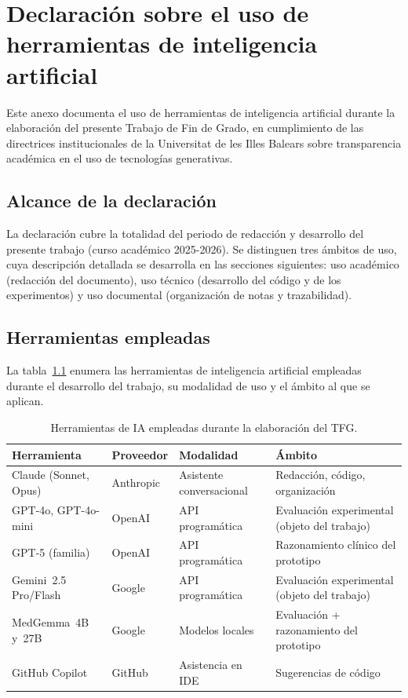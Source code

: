 
\chapter{Declaración sobre el uso de herramientas de inteligencia artificial}
\label{anexo:declaracion-ia}
\label{cap:anexod}

Este anexo documenta el uso de herramientas de inteligencia
artificial durante la elaboración del presente Trabajo de Fin de
Grado, en cumplimiento de las directrices institucionales de la
Universitat de les Illes Balears sobre transparencia académica en
el uso de tecnologías generativas.

\section{Alcance de la declaración}
\label{sec:anexod-alcance}

La declaración cubre la totalidad del periodo de redacción y
desarrollo del presente trabajo (curso académico 2025-2026). Se
distinguen tres ámbitos de uso, cuya descripción detallada se
desarrolla en las secciones siguientes: uso académico (redacción
del documento), uso técnico (desarrollo del código y de los
experimentos) y uso documental (organización de notas y
trazabilidad).

\section{Herramientas empleadas}
\label{sec:anexod-herramientas}

La tabla~\ref{tab:anexod-herramientas} enumera las herramientas
de inteligencia artificial empleadas durante el desarrollo del
trabajo, su modalidad de uso y el ámbito al que se aplican.

\begin{table}[H]
\centering
\footnotesize
\setlength{\tabcolsep}{4pt}
\renewcommand{\arraystretch}{0.95}
\caption{Herramientas de IA empleadas durante la elaboración del
TFG.}
\label{tab:anexod-herramientas}
\begin{tabular}{llll}
\hline
Herramienta              & Proveedor   & Modalidad           & Ámbito \\
\hline
Claude (Sonnet, Opus)    & Anthropic   & Asistente conversacional & Redacción, código, organización \\
GPT-4o, GPT-4o-mini      & OpenAI      & API programática      & Evaluación experimental (objeto del trabajo) \\
GPT-5 (familia)          & OpenAI      & API programática      & Razonamiento clínico del prototipo \\
Gemini~2.5 Pro/Flash     & Google      & API programática      & Evaluación experimental (objeto del trabajo) \\
MedGemma~4B y~27B        & Google      & Modelos locales       & Evaluación + razonamiento del prototipo \\
GitHub Copilot           & GitHub      & Asistencia en IDE     & Sugerencias de código \\
\hline
\end{tabular}
\end{table}

